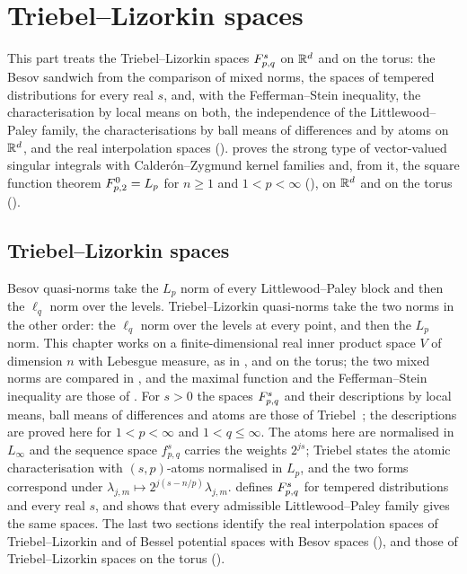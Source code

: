 
\part{Triebel--Lizorkin spaces}
\label{part:triebel-lizorkin}

This part treats the Triebel--Lizorkin spaces $F^{s}_{p,q}$ on $\mathbb{R}^d$ and on the torus: the
Besov sandwich from the comparison of mixed norms, the spaces of tempered distributions for
every real $s$, and, with the Fefferman--Stein inequality, the characterisation by local means
on both, the independence of the Littlewood--Paley family, the characterisations by ball means
of differences and by atoms on $\mathbb{R}^d$, and the real interpolation spaces
().  proves the
strong type of vector-valued singular integrals with Calder\'on--Zygmund kernel families and,
from it, the square function theorem $F^{0}_{p,2} = L_p$ for $n \geq 1$ and $1 < p < \infty$
(), on $\mathbb{R}^d$ and on the torus
().

\chapter{Triebel--Lizorkin spaces}
\label{ch:triebel-lizorkin}

Besov quasi-norms take the $L_p$ norm of every Littlewood--Paley block and then the $\ell_q$ norm
over the levels. Triebel--Lizorkin quasi-norms take the two norms in the other order: the $\ell_q$
norm over the levels at every point, and then the $L_p$ norm. This chapter works on a
finite-dimensional real inner product space $V$ of dimension $n$ with Lebesgue measure, as in
, and on the torus; the two mixed norms are compared in , and
the maximal function and the Fefferman--Stein inequality are those of
. For $s > 0$ the spaces
$F^{s}_{p,q}$ and their descriptions by local means, ball means of differences and atoms are
those of Triebel~\cite{TriebelII}; the descriptions are proved here for $1 < p < \infty$ and
$1 < q \leq \infty$. The atoms here are normalised in $L_\infty$ and the sequence space
$f^s_{p,q}$ carries the weights $2^{js}$; Triebel states the atomic characterisation with
$(s,p)$-atoms normalised in $L_p$, and the two forms correspond under
$\lambda_{j,m} \mapsto 2^{j(s - n/p)} \lambda_{j,m}$.  defines
$F^{s}_{p,q}$ for tempered distributions and every real $s$, and
 shows that every admissible Littlewood--Paley family gives
the same spaces. The last two sections identify
the real interpolation spaces of Triebel--Lizorkin and of Bessel potential spaces with Besov spaces
(), and those of Triebel--Lizorkin spaces on the torus
().

